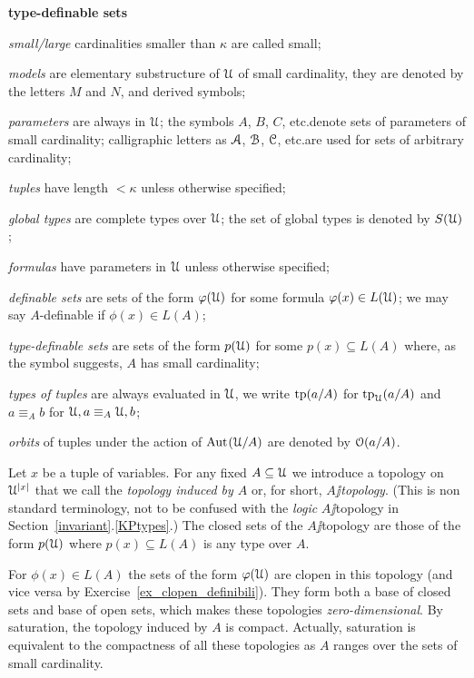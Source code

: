\documentclass[creche.tex]{subfiles}
\begin{document}
\begin{litemize}{{\bf type-definable sets}}
\item[\emph{small/large}] cardinalities smaller than $\kappa$ are called small; 
\item[\emph{models}] are elementary substructure of $\EuScript U$ of small cardinality, they are denoted by the letters $M$ and $N$, and derived symbols;
\item[\emph{parameters}] are always in $\EuScript U$; the symbols $A$, $B$, $C$, etc.\@ denote sets of parameters of small cardinality; calligraphic letters as $\EuScript A$, $\EuScript B$, $\EuScript C$, etc.\@ are used for sets of arbitrary cardinality;
\item[\emph{tuples}]  have length $<\kappa$ unless otherwise specified;
\item[\emph{global types}] are complete types over $\EuScript U$; the set of global types is denoted by $S(\EuScript U)$;
\item[\emph{formulas}] have parameters in $\EuScript U$ unless otherwise specified;
\item[\emph{definable sets}] are sets of the form $\varphi(\EuScript U)$ for some formula $\varphi(x)\in L(\EuScript U)$; we may say $A$-definable if $\phi(x)\in L(A)$;
\item[\emph{type-definable sets}] are sets of the form $p(\EuScript U)$ for some $p(x)\subseteq L(A)$ where, as the symbol suggests, $A$ has small cardinality;
\item[\emph{types of tuples}] are always evaluated in $\EuScript U$, we write ${\rm tp}(a/A)$ for ${\rm tp}_\EuScript U(a/A)$ and $a\equiv_A b$ for $\EuScript U,a \equiv_A \EuScript U,b$; 
\item[\emph{orbits}] of tuples under the action of $\textrm{Aut\kern.15ex}(\EuScript U/A)$ are denoted by $\EuScript O(a/A)$.
\end{litemize}


Let $x$ be a tuple of variables. For any fixed $A\subseteq \EuScript U$ we introduce a topology on $\EuScript U^{|x|}$ that we call the \emph{topology induced by $A$} or, for short, \emph{$A\jj$topology}. (This is non standard terminology, not to be confused with the \textit{logic\/} $A\jj$topology in Section~\ref{invariant}.\ref{KPtypes}.) The closed sets of the $A\jj$topology are those of the form $p(\EuScript U)$ where $p(x)\subseteq L(A)$ is any type over $A$.

For $\phi(x)\in L(A)$ the sets of the form $\varphi(\EuScript U)$ are clopen in this topology (and vice versa by Exercise~\ref{ex_clopen_definibili}). They form both a base of closed sets and base of open sets, which makes these topologies \textit{zero-dimensional}. By saturation, the topology induced by $A$ is compact. Actually, saturation is equivalent to the compactness of all these topologies as $A$ ranges over the sets of small cardinality.
\end{document}
